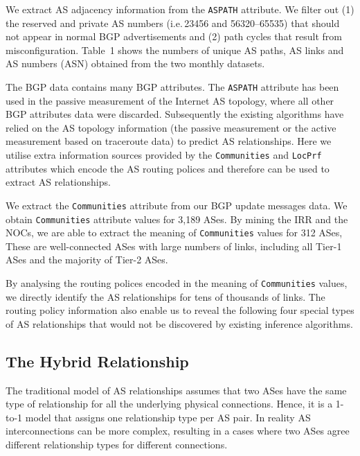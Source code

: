 \documentclass[conference]{IEEEtran}
\begin{document}
We extract AS adjacency information from the {\tt ASPATH} attribute. 
We filter out (1) the reserved and private AS numbers (i.e.\,23456 and 56320--65535) that should not appear in normal BGP advertisements and (2) path cycles that result from misconfiguration. 
Table~1 shows the numbers of unique AS paths, AS links and AS numbers (ASN) obtained from the two monthly datasets.

The BGP data contains many BGP attributes. The {\tt ASPATH} attribute has been used in the passive measurement of the Internet AS topology, where all other BGP attributes data were discarded. Subsequently the existing algorithms  have relied on the AS topology information (the passive measurement or the active measurement based on traceroute data) to predict AS relationships. 
Here we utilise extra information sources provided by the  {\tt Communities} and {\tt LocPrf}  attributes
which encode the AS routing polices and therefore can be used to extract AS relationships.




We extract the {\tt Communities} attribute  from our BGP update messages data. 
We obtain {\tt Communities} attribute values for 3,189  ASes. By mining the IRR and the NOCs, we are able to extract the meaning of {\tt Communities} values for 312 ASes, These are well-connected ASes with large numbers of links, including all Tier-1 ASes and the majority of Tier-2 ASes.  

By analysing the routing polices encoded in the meaning of {\tt Communities} values, we directly identify the AS relationships for tens of thousands of links. The routing policy information also enable us to reveal the following four special types of AS relationships that would not be discovered by existing inference algorithms.


\subsection{The Hybrid Relationship}

The traditional model of AS relationships assumes that two ASes have the same type of relationship for all the underlying physical connections. Hence, it is a 1-to-1 model that assigns one relationship type per AS pair. In reality AS interconnections can be more complex, resulting in a cases where two ASes agree different relationship types for different connections. 
\end{document}
